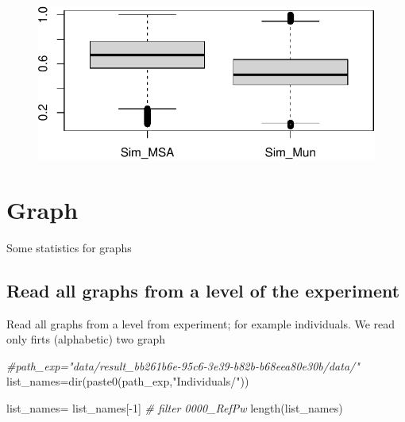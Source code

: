 \documentclass[
  letterpaper,
  DIV=11,
  numbers=noendperiod]{scrreprt}
\newenvironment{Shaded}{}{}
\newcommand{\CommentTok}[1]{\textcolor[rgb]{0.36,0.39,0.44}{\textit{#1}}}
\newcommand{\DecValTok}[1]{\textcolor[rgb]{0.82,0.60,0.40}{#1}}
\newcommand{\FunctionTok}[1]{\textcolor[rgb]{0.38,0.69,0.94}{#1}}
\newcommand{\NormalTok}[1]{\textcolor[rgb]{0.67,0.70,0.75}{#1}}
\newcommand{\OtherTok}[1]{\textcolor[rgb]{0.15,0.68,0.38}{#1}}
\newcommand{\SpecialCharTok}[1]{\textcolor[rgb]{0.34,0.71,0.76}{#1}}
\newcommand{\StringTok}[1]{\textcolor[rgb]{0.60,0.76,0.47}{#1}}
\begin{document}
\begin{figure}[H]

{\centering \includegraphics[width=1\textwidth,height=\textheight]{index_files/figure-pdf/unnamed-chunk-45-1.pdf}

}

\end{figure}


\hypertarget{graph}{%
\chapter{Graph}\label{graph}}

Some statistics for graphs

\hypertarget{read-all-graphs-from-a-level-of-the-experiment}{%
\section{Read all graphs from a level of the
experiment}\label{read-all-graphs-from-a-level-of-the-experiment}}

Read all graphs from a level from experiment; for example individuals.
We read only firts (alphabetic) two graph

\begin{Shaded}
\begin{Highlighting}[]
\CommentTok{\#path\_exp="data/result\_bb261b6e{-}95c6{-}3e39{-}b82b{-}b68eea80e30b/data/"}
\NormalTok{list\_names}\OtherTok{=}\FunctionTok{dir}\NormalTok{(}\FunctionTok{paste0}\NormalTok{(path\_exp,}\StringTok{"Individuals/"}\NormalTok{))}

\NormalTok{list\_names}\OtherTok{=}\NormalTok{ list\_names[}\SpecialCharTok{{-}}\DecValTok{1}\NormalTok{] }\CommentTok{\# filter 0000\_RefPw}
\FunctionTok{length}\NormalTok{(list\_names)}
\end{Highlighting}
\end{Shaded}
\end{document}

